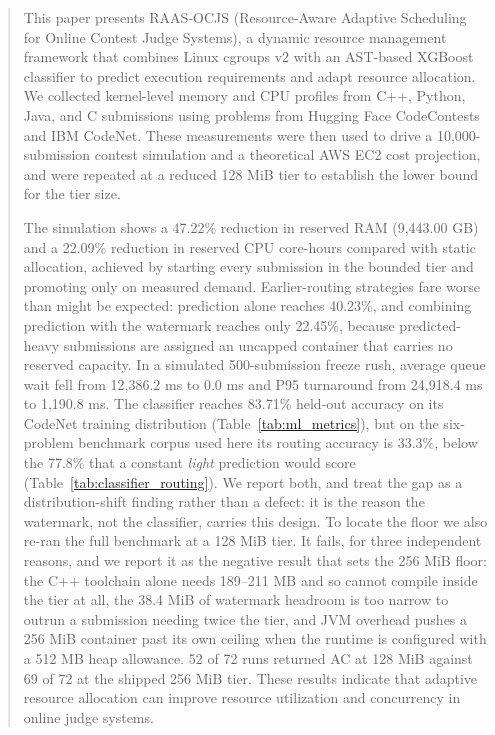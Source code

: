 \documentclass[conference]{IEEEtran}
\begin{document}
\begin{abstract}
This paper presents RAAS-OCJS (Resource-Aware Adaptive Scheduling for Online Contest Judge Systems), a dynamic resource management framework that combines Linux cgroups v2 with an AST-based XGBoost classifier to predict execution requirements and adapt resource allocation. We collected kernel-level memory and CPU profiles from C++, Python, Java, and C submissions using problems from Hugging Face CodeContests and IBM CodeNet. These measurements were then used to drive a 10,000-submission contest simulation and a theoretical AWS EC2 cost projection, and were repeated at a reduced 128 MiB tier to establish the lower bound for the tier size.

The simulation shows a 47.22\% reduction in reserved RAM (9,443.00 GB) and a 22.09\% reduction in reserved CPU core-hours compared with static allocation, achieved by starting every submission in the bounded tier and promoting only on measured demand. Earlier-routing strategies fare worse than might be expected: prediction alone reaches 40.23\%, and combining prediction with the watermark reaches only 22.45\%, because predicted-heavy submissions are assigned an uncapped container that carries no reserved capacity. In a simulated 500-submission freeze rush, average queue wait fell from 12,386.2 ms to 0.0 ms and P95 turnaround from 24,918.4 ms to 1,190.8 ms. The classifier reaches 83.71\% held-out accuracy on its CodeNet training distribution (Table~\ref{tab:ml_metrics}), but on the six-problem benchmark corpus used here its routing accuracy is 33.3\%, below the 77.8\% that a constant \emph{light} prediction would score (Table~\ref{tab:classifier_routing}). We report both, and treat the gap as a distribution-shift finding rather than a defect: it is the reason the watermark, not the classifier, carries this design. To locate the floor we also re-ran the full benchmark at a 128 MiB tier. It fails, for three independent reasons, and we report it as the negative result that sets the 256 MiB floor: the C++ toolchain alone needs 189--211 MB and so cannot compile inside the tier at all, the 38.4 MiB of watermark headroom is too narrow to outrun a submission needing twice the tier, and JVM overhead pushes a 256 MiB container past its own ceiling when the runtime is configured with a 512 MB heap allowance. 52 of 72 runs returned AC at 128 MiB against 69 of 72 at the shipped 256 MiB tier. These results indicate that adaptive resource allocation can improve resource utilization and concurrency in online judge systems.   
\end{abstract}
\end{document}
